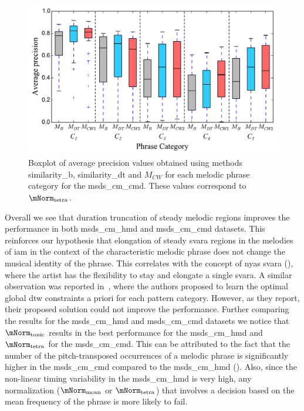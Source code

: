 \begin{figure}
	\begin{center}
		\includegraphics[width=\figSizeEightyFive]{ch06_patterns/figures/ImprovingSimilarity/CarnaticPerCategoryPerformance_BOXPLOT.pdf}
	\end{center}
	\caption{Boxplot of average precision values obtained using methods \acrshort{similarity_b}, \acrshort{similarity_dt} and $M_{CW}$ for each melodic phrase category for the \acrshort{msds_cm_cmd}. These values correspond to $\mNorm_\mathrm{tetra}$.}
	\label{fig:carnaticPerCategoryPerformance}
\end{figure}


Overall we see that duration truncation of steady melodic regions improves the performance in both \acrshort{msds_cm_hmd} and \acrshort{msds_cm_cmd} datasets. This reinforces our hypothesis that elongation of steady \gls{svara} regions in the melodies of \gls{iam} in the context of the characteristic melodic phrase does not change the musical identity of the phrase. This correlates with the concept of \gls{nyas} \gls{svara} (), where the artist has the flexibility to stay and elongate a single \gls{svara}. A similar observation was reported in~\cite{Rao2014}, where the authors proposed to learn the optimal global \gls{dtw} constraints a priori for each pattern category. However, as they report, their proposed solution could not improve the performance. Further comparing the results for the \acrshort{msds_cm_hmd} and \acrshort{msds_cm_cmd} datasets we notice that $\mNorm_\mathrm{tonic}$ results in the best performance for the \acrshort{msds_cm_hmd} and $\mNorm_\mathrm{tetra}$ for the \acrshort{msds_cm_cmd}. This can be attributed to the fact that the number of the pitch-transposed occurrences of a melodic phrase is significantly higher in the \acrshort{msds_cm_cmd} compared to the \acrshort{msds_cm_hmd} (). Also, since the non-linear timing variability in the \acrshort{msds_cm_hmd} is very high, any normalization ($\mNorm_\mathrm{mean}$ or $\mNorm_\mathrm{tetra}$) that involves a decision based on the mean frequency of the phrase is more likely to fail.


